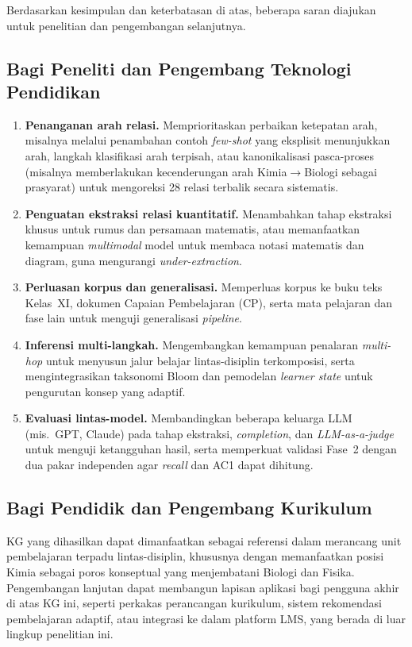 \documentclass[main]{subfiles}
\begin{document}
Berdasarkan kesimpulan dan keterbatasan di atas, beberapa saran diajukan untuk
penelitian dan pengembangan selanjutnya.

\subsection{Bagi Peneliti dan Pengembang Teknologi Pendidikan}

\begin{enumerate}
  \item \textbf{Penanganan arah relasi.} Memprioritaskan perbaikan ketepatan arah,
        misalnya melalui penambahan contoh \textit{few-shot} yang eksplisit
        menunjukkan arah, langkah klasifikasi arah terpisah, atau kanonikalisasi
        pasca-proses (misalnya memberlakukan kecenderungan arah Kimia$\to$Biologi
        sebagai prasyarat) untuk mengoreksi 28 relasi terbalik secara sistematis.

  \item \textbf{Penguatan ekstraksi relasi kuantitatif.} Menambahkan tahap
        ekstraksi khusus untuk rumus dan persamaan matematis, atau memanfaatkan
        kemampuan \textit{multimodal} model untuk membaca notasi matematis dan
        diagram, guna mengurangi \textit{under-extraction}.

  \item \textbf{Perluasan korpus dan generalisasi.} Memperluas korpus ke buku teks
        Kelas~XI, dokumen Capaian Pembelajaran (CP), serta mata pelajaran dan fase
        lain untuk menguji generalisasi \textit{pipeline}.

  \item \textbf{Inferensi multi-langkah.} Mengembangkan kemampuan penalaran
        \textit{multi-hop} untuk menyusun jalur belajar lintas-disiplin
        terkomposisi, serta mengintegrasikan taksonomi Bloom dan pemodelan
        \textit{learner state} untuk pengurutan konsep yang adaptif.

  \item \textbf{Evaluasi lintas-model.} Membandingkan beberapa keluarga LLM (mis.\
        GPT, Claude) pada tahap ekstraksi, \textit{completion}, dan
        \textit{LLM-as-a-judge} untuk menguji ketangguhan hasil, serta memperkuat
        validasi Fase~2 dengan dua pakar independen agar \textit{recall} dan AC1
        dapat dihitung.
\end{enumerate}

\subsection{Bagi Pendidik dan Pengembang Kurikulum}

KG yang dihasilkan dapat dimanfaatkan sebagai referensi dalam merancang unit
pembelajaran terpadu lintas-disiplin, khususnya dengan memanfaatkan posisi Kimia
sebagai poros konseptual yang menjembatani Biologi dan Fisika. Pengembangan
lanjutan dapat membangun lapisan aplikasi bagi pengguna akhir di atas KG ini,
seperti perkakas perancangan kurikulum, sistem rekomendasi pembelajaran adaptif,
atau integrasi ke dalam platform LMS, yang berada di luar lingkup penelitian ini.

\ifSubfilesClassLoaded{\printbibliography[title={Daftar Pustaka}]}{}
\end{document}
